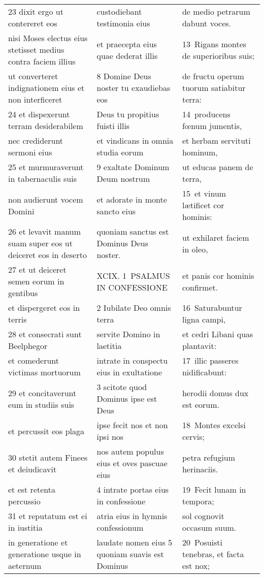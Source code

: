 \documentclass{article}
\begin{document}
\begin{longtable}{@{}p{}p{}p{}@{}}
23 dixit ergo ut contereret eos	&	custodiebant testimonia eius	&	de medio petrarum dabunt voces.	\\
nisi Moses electus eius stetisset medius contra faciem illius	&	et praecepta eius quae dederat illis	&	13 Rigans montes de superioribus suis;	\\
ut converteret indignationem eius et non interficeret	&	8 Domine Deus noster tu exaudiebas eos	&	de fructu operum tuorum satiabitur terra:	\\
24 et dispexerunt terram desiderabilem	&	Deus tu propitius fuisti illis	&	14 producens fœnum jumentis,	\\
nec crediderunt sermoni eius	&	et vindicans in omnia studia eorum	&	et herbam servituti hominum,	\\
25 et murmuraverunt in tabernaculis suis	&	9 exaltate Dominum Deum nostrum	&	ut educas panem de terra,	\\
non audierunt vocem Domini	&	et adorate in monte sancto eius	&	15 et vinum lætificet cor hominis:	\\
26 et levavit manum suam super eos ut deiceret eos in deserto	&	quoniam sanctus est Dominus Deus noster.	&	ut exhilaret faciem in oleo,	\\
27 et ut deiceret semen eorum in gentibus	&	XCIX. 1 PSALMUS IN CONFESSIONE	&	et panis cor hominis confirmet.	\\
et dispergeret eos in terris	&	2 Iubilate Deo omnis terra	&	16 Saturabuntur ligna campi,	\\
28 et consecrati sunt Beelphegor	&	servite Domino in laetitia	&	et cedri Libani quas plantavit:	\\
et comederunt victimas mortuorum	&	intrate in conspectu eius in exultatione	&	17 illic passeres nidificabunt:	\\
29 et concitaverunt eum in studiis suis	&	3 scitote quod Dominus ipse est Deus	&	herodii domus dux est eorum.	\\
et percussit eos plaga	&	ipse fecit nos et non ipsi nos	&	18 Montes excelsi cervis;	\\
30 stetit autem Finees et deiudicavit	&	nos autem populus eius et oves pascuae eius	&	petra refugium herinaciis.	\\
et est retenta percussio	&	4 intrate portas eius in confessione	&	19 Fecit lunam in tempora;	\\
31 et reputatum est ei in iustitia	&	atria eius in hymnis confessionum	&	sol cognovit occasum suum.	\\
in generatione et generatione usque in aeternum	&	laudate nomen eius 5 quoniam suavis est Dominus	&	20 Posuisti tenebras, et facta est nox;	\\

\end{longtable}
\end{document}
